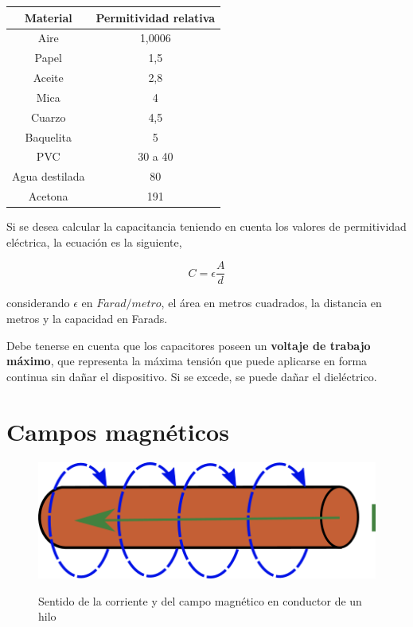 \begin{tabular}{|c|c|}
\hline 
Material & Permitividad relativa \\ 
\hline 
Aire & 1,0006 \\ 
\hline 
Papel & 1,5 \\ 
\hline 
Aceite & 2,8 \\ 
\hline 
Mica & 4 \\ 
\hline 
Cuarzo & 4,5 \\ 
\hline 
Baquelita & 5 \\ 
\hline 
PVC & 30 a 40 \\ 
\hline 
Agua destilada & 80 \\ 
\hline 
Acetona & 191 \\ 
\hline 
\end{tabular} 

Si se desea calcular la capacitancia teniendo en cuenta los valores de permitividad eléctrica, la ecuación es la siguiente,

\begin{equation}
	\label{eq:capacitancia_permitividad}
	C = \epsilon \frac{A}{d}
\end{equation}

considerando $\epsilon $ en $Farad/metro$, el área en metros cuadrados, la distancia en metros y la capacidad en Farads.

Debe tenerse en cuenta que los capacitores poseen un \textbf{voltaje de trabajo máximo}, que representa la máxima tensión que puede aplicarse en forma continua sin dañar el dispositivo. Si se excede, se puede dañar el dieléctrico.

\section{Campos magnéticos}

\begin{figure}
	\centering
		\includegraphics[scale=0.5]{images/electroiman-un-hilo}
	\label{fig:electroiman-hilo}
	\caption{Sentido de la corriente y del campo magnético en conductor de un hilo}
\end{figure}

